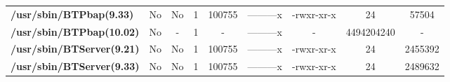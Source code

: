 \begin{center}
{\begin{tabular}{|>{\bfseries} l | C | C | C | C | C | C | C | C |}
					/usr/sbin/BTPbap(9.33) & No & No & \color{green}1 & \color{red}100755 & \color{green}---------x & \color{red}-rwxr-xr-x & \color{green}24 & \color{red}57504\\ 
					/usr/sbin/BTPbap(10.02) & No & - & 1 & - & ---------x & - & 4494204240 & -\\ 
					/usr/sbin/BTServer(9.21) & No & No & \color{green}1 & \color{red}100755 & \color{green}---------x & \color{red}-rwxr-xr-x & \color{green}24 & \color{red}2455392\\ 
					/usr/sbin/BTServer(9.33) & No & No & \color{green}1 & \color{red}100755 & \color{green}---------x & \color{red}-rwxr-xr-x & \color{green}24 & \color{red}2489632\\ 

			\end{tabular}
		}
	\end{center}



